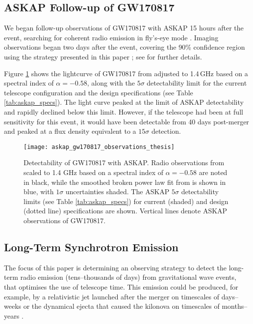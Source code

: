 \subsection{ASKAP Follow-up of GW170817}
We began follow-up observations of GW170817 with ASKAP 15 hours after the event, searching for coherent radio emission in fly's-eye mode \citep{GCN21562,GCN21671}. Imaging observations began two days after the event, covering the 90\% confidence region using the strategy presented in this paper \citep{GCN21625,GCN21639}; see \citet{2017PASA...34...69A} for further details.

Figure \ref{fig:gw170817_prediction} shows the lightcurve of GW170817 from \citet{2018ApJ...858L..15D} adjusted to 1.4\,GHz based on a spectral index of $\alpha=-0.58$, along with the $5\sigma$ detectability limit for the current telescope configuration and the design specifications (see Table \ref{tab:askap_specs}). The light curve peaked at the limit of ASKAP detectability and rapidly declined below this limit. However, if the telescope had been at full sensitivity for this event, it would have been detectable from 40 days post-merger and peaked at a flux density equivalent to a $15\sigma$ detection.

\begin{figure}[h!]
    \centering
	\texttt{[image: askap\_gw170817\_observations\_thesis]}
	\caption[Detectability of GW170817 with ASKAP]{Detectability of GW170817 with ASKAP. Radio observations from \citet{2017Sci...358.1579H,2018Natur.554..207M,2018ApJ...858L..15D,2018ApJ...868L..11M} scaled to 1.4 GHz based on a spectral index of $\alpha=-0.58$ are noted in black, while the smoothed broken power law fit from \citet{2018ApJ...858L..15D} is shown in blue, with $1\sigma$ uncertainties shaded. The ASKAP $5\sigma$ detectability limits (see Table \ref{tab:askap_specs}) for current (shaded) and design (dotted line) specifications are shown. Vertical lines denote ASKAP observations of GW170817.}
	\label{fig:gw170817_prediction}
\end{figure}

\subsection{Long-Term Synchrotron Emission}
\label{sec:longterm_emission}
The focus of this paper is determining an observing strategy to detect the long-term radio emission (tens--thousands of days) from gravitational wave events, that optimises the use of telescope time. This emission could be produced, for example, by a relativistic jet launched after the merger \citep{2002ApJ...570L..61G} on timescales of days--weeks or the dynamical ejecta that caused the kilonova on timescales of months--years \citep{2011Natur.478...82N,2015MNRAS.450.1430H}.

